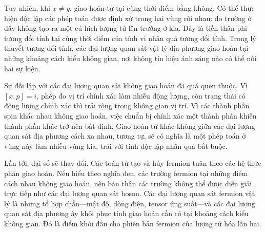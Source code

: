 \begin{classroomqa}\end{classroomqa}

Tuy nhiên, khi \(x\neq y\), giao hoán tử tại cùng thời điểm bằng không. Có thể thực hiện độc lập các phép toán được định xứ trong hai vùng rời nhau: đo trường ở đây không tạo ra một cú hích lượng tử lên trường ở kia. Đây là tiền thân phi tương đối tính tại cùng thời điểm của tính vi nhân quả tương đối tính. Trong lý thuyết tương đối tính, các đại lượng quan sát vật lý địa phương giao hoán tại những khoảng cách kiểu không gian, nơi không tín hiệu ánh sáng nào có thể nối hai sự kiện.

Sự đối lập với các đại lượng quan sát không giao hoán đã quá quen thuộc. Vì \([x,p]=i\), phép đo vị trí chính xác làm nhiễu động lượng, còn trạng thái có động lượng chính xác thì trải rộng trong không gian vị trí. Vì các thành phần spin khác nhau không giao hoán, việc chuẩn bị chính xác một thành phần khiến thành phần khác trở nên bất định. Giao hoán tử khác không giữa các đại lượng quan sát địa phương cách xa nhau, tương tự, sẽ có nghĩa là một phép toán ở vùng này làm nhiễu vùng kia, trái với tính độc lập nhân quả bắt buộc.

\begin{classroomqa}\end{classroomqa}

Lần tới, đại số sẽ thay đổi. Các toán tử tạo và hủy fermion tuân theo các hệ thức phản giao hoán. Nếu hiểu theo nghĩa đen, các trường fermion tại những điểm cách nhau không giao hoán, nên bản thân các trường không thể được diễn giải trực tiếp như các đại lượng quan sát boson. Các đại lượng quan sát fermion vật lý là những tổ hợp chẵn---mật độ, dòng điện, tensor ứng suất---và các đại lượng quan sát địa phương ấy khôi phục tính giao hoán cần có tại khoảng cách kiểu không gian. Đó là điểm khởi đầu cho phiên bản fermion của lượng tử hóa lần hai.
